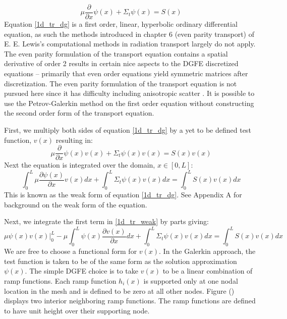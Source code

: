 \begin{equation}
\mu \frac{\partial}{\partial x} \psi(x) + \Sigma_t \psi(x) = S(x)
\label{1d_tr_dg}
\end{equation}
Equation \ref{1d_tr_dg} is a first order, linear, hyperbolic ordinary differential equation, as such the methods introduced in chapter 6
(even parity transport) of E. E. Lewis’s computational methods in radiation transport largely do not apply. The even parity formulation of the transport equation contains a spatial derivative of order 2 results
in certain nice aspects to the DGFE discretized equations – primarily that even order equations yield
symmetric matrices after discretization. The even parity formulation of the transport equation is not pursued here
since it has difficulty including anisotropic scatter \cite{Lewis}. It is possible to use the Petrov-Galerkin method
on the first order equation without constructing the second order form of the transport equation.

First, we multiply both sides of equation \ref{1d_tr_dg} by a yet to be defined test function, $v(x)$ resulting in:
\begin{equation}
\mu \frac{\partial}{\partial x} \psi(x) v(x) + \Sigma_t \psi(x)v(x) = S(x)v(x)
\label{1d_tr_dg2}
\end{equation}
Next the equation is integrated over the domain, $x \in [0, L]$:
\begin{equation}
\int_0^L \mu \frac{\partial \psi(x)}{\partial x} v(x) dx + \int_0^L \Sigma_t \psi(x)v(x) dx =  \int_0^L S(x)v(x) dx
\label{1d_tr_weak}
\end{equation}
This is known as the weak form of equation \ref{1d_tr_dg}.
See Appendix A for background on the weak form of the equation.

Next, we integrate the first term in \ref{1d_tr_weak} by parts giving:
\begin{equation}
\mu \psi(x)v(x)|_0^L- \mu \int_0^L  \psi(x) \frac{\partial v(x)}{\partial x} dx + \int_0^L \Sigma_t \psi(x)v(x) dx =  \int_0^L S(x)v(x) dx
\label{1d_tr_weak2}
\end{equation}
We are free to choose a functional form for $v(x)$. In the Galerkin approach, the test function is
taken to be of the same form as the solution approximation $\psi(x)$. The simple DGFE choice is to take $v(x)$ to be a
linear combination of ramp functions. Each ramp function $h_i(x)$ is supported only at one nodal location in the mesh
and is defined to be zero at all other nodes. Figure () displays two interior neighboring ramp functions. The ramp functions are defined to have unit height over their supporting node.